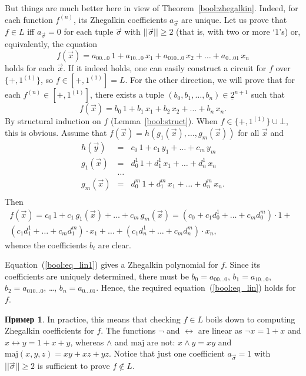 \documentclass[12pt,notitlepage]{article}
\theoremstyle{plain}
\theoremstyle{definition}
\newtheorem{exm}[thm]{Пример}
\theoremstyle{plain}
\newcommand{\ul}[1]{\underline{#1}}
\newcommand{\1}{\mathbf{1}}
\newcommand{\0}{\mathbf{0}}
\begin{document}
But things are much better here in view of Theorem~\ref{bool:zhegalkin}. Indeed, for each function $f^{(n)}$, its Zhegalkin coefficients $a_{\vec\sigma}$ are unique. Let us prove that $f \in L$ iff $a_{\vec\sigma} = 0$ for each tuple $\vec\sigma$ with $||\vec\sigma|| \geq 2$ (that is, with two or more `$1$'s) or, equivalently, the equation
\begin{equation}\label{bool:eq_lin}
	f(\vec x) = a_{00\ldots0}\, 1 + a_{10\ldots0}\, x_1 + a_{010\ldots0}\, x_2 + \ldots + a_{0\ldots01}\, x_n
\end{equation}
holds for each $\vec x$. If it indeed holds, one can easily construct a circuit for $f$ over $\{{+}, 1^{(1)}\}$, so $f \in [{+}, 1^{(1)}] = L$. For the other direction, we will prove that for each $f^{(n)} \in [{+}, 1^{(1)}]$, there exists a tuple $(b_0, b_1, \ldots, b_n) \in \ul{2}^{n + 1}$  such that
\begin{equation}\label{bool:eq_lin1}
	f(\vec x) = b_0\, 1 + b_1\, x_1 + b_2\, x_2 + \ldots + b_n\, x_n.
\end{equation}
By structural induction on $f$ (Lemma~\ref{bool:struct}). When $f \in \{{+}, 1^{(1)}\} \cup \bot$, this is obvious. Assume that $f(\vec x) = h(g_1(\vec x),\ldots, g_m(\vec x))$ for all $\vec x$ and
$$
\begin{array}{rcl}
	h(\vec y) &=& c_0\, 1 + c_1\, y_1 + \ldots + c_m\, y_m\\
	g_1(\vec x) &=& d^1_0\, 1 + d^1_1\, x_1 + \ldots + d^1_n\, x_n\\ 
	&\ldots&\\
	g_m(\vec x) &=& d^m_0\, 1 + d^m_1\, x_1 + \ldots + d^m_n\, x_n.\\ 
\end{array}
$$
Then
\begin{multline*}
	f(\vec x) = c_0\, 1 + c_1\, g_1(\vec x) + \ldots + c_m\, g_m(\vec x) = (c_0 + c_1 d^1_0 + \ldots + c_m d^m_0) \cdot 1 +\phantom{1}\\
	(c_1 d^1_1 + \ldots + c_m d^m_1) \cdot x_1 + \ldots + (c_1 d^1_n + \ldots + c_m d^m_n) \cdot x_n,
\end{multline*}
whence the coefficients $b_i$ are clear.

Equation~(\ref{bool:eq_lin1}) gives a Zhegalkin polynomial for $f$. Since its coefficients are uniquely determined, there must be $b_0 = a_{00\ldots0}$, $b_1 = a_{10\ldots0}$, $b_2 = a_{010\ldots0}$, \dots, $b_n = a_{0\ldots01}$. Hence, the required equation~(\ref{bool:eq_lin}) holds for $f$.

\begin{exm}
	In practice, this means that checking $f \in L$ boils down to computing Zhegalkin coefficients for $f$. The functions $\neg$ and $\leftrightarrow$ are linear as $\neg x = 1 + x$ and $x \leftrightarrow y = 1 + x + y$, whereas $\wedge$ and $\mathrm{maj}$ are not: $x \wedge y = x y$ and $\mathrm{maj}(x,y,z) = xy + xz + yz$. Notice that just one coefficient $a_{\vec\sigma} = 1$ with $||\vec\sigma|| \geq 2$ is sufficient to prove $f \notin L$.
\end{exm}
\end{document}
